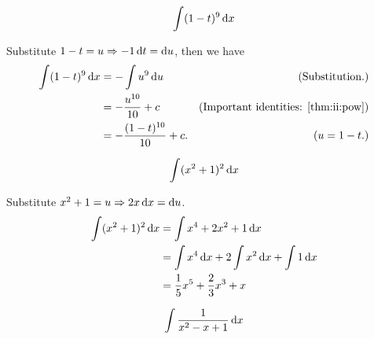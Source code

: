 \begin{question}
    \begin{align}
        \int (1 - t)^9 \mathop{}\!\mathrm{d} x
    \end{align}
\end{question}
\begin{solution}
    Substitute \(1 - t = u \Rightarrow -1 \mathop{}\!\mathrm{d} t = \mathop{}\!\mathrm{d} u\), then we have
    \begin{align}
        \int (1 - t)^9 \mathop{}\!\mathrm{d} x &= - \int u^9 \mathop{}\!\mathrm{d} u & \text{(Substitution.)}\\
        &= -\frac{u ^{10}}{10} + c & \text{(Important identities: \ref{thm:ii:pow})} \\
        &= -\frac{(1 - t)^{10}}{10} + c \text{.} & \text{(\(u = 1 - t\).)}
    \end{align}
\end{solution}
\begin{question}
    \begin{align}
        \int (x^2 + 1)^2 \mathop{}\!\mathrm{d} x
    \end{align}
\end{question}
\begin{solution}
    Substitute \(x^2 + 1 = u \Rightarrow 2x \mathop{}\!\mathrm{d} x = \mathop{}\!\mathrm{d} u\).
    \begin{align}
        \int (x^2 + 1)^2 \mathop{}\!\mathrm{d} x &= \int x^4 + 2x^2 + 1 \mathop{}\!\mathrm{d} x \\
        &= \int x^4 \mathop{}\!\mathrm{d} x + 2 \int x^2 \mathop{}\!\mathrm{d} x + \int 1 \mathop{}\!\mathrm{d} x \\
        &= \frac{1}{5} x^5 + \frac{2}{3} x^3 + x
    \end{align}
\end{solution}
\begin{question}
    \begin{align}
        \int \frac{1}{x^2 -x + 1} \mathop{}\!\mathrm{d} x
    \end{align}
\end{question}
